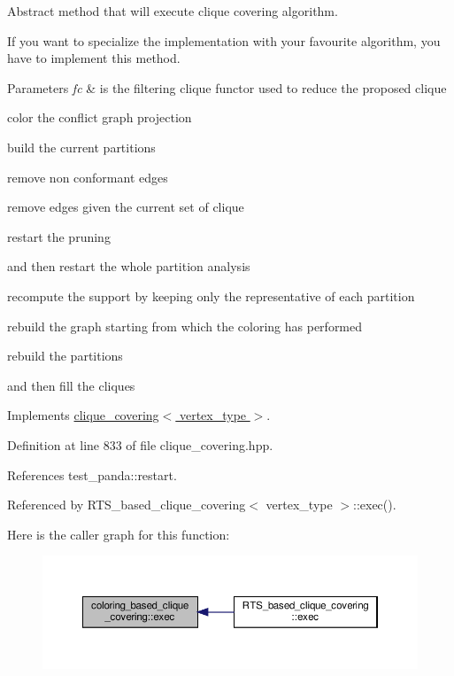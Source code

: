 Abstract method that will execute clique covering algorithm. 

If you want to specialize the implementation with your favourite algorithm, you have to implement this method. 
\begin{DoxyParams}{Parameters}
{\em fc} & is the filtering clique functor used to reduce the proposed clique \\
\hline
\end{DoxyParams}
color the conflict graph projection

build the current partitions

remove non conformant edges

remove edges given the current set of clique

restart the pruning

and then restart the whole partition analysis

recompute the support by keeping only the representative of each partition

rebuild the graph starting from which the coloring has performed

rebuild the partitions

and then fill the cliques 

Implements \hyperlink{classclique__covering_a54c35fc0f400f32f3d412783685150ef}{clique\+\_\+covering$<$ vertex\+\_\+type $>$}.



Definition at line 833 of file clique\+\_\+covering.\+hpp.



References test\+\_\+panda\+::restart.



Referenced by R\+T\+S\+\_\+based\+\_\+clique\+\_\+covering$<$ vertex\+\_\+type $>$\+::exec().

Here is the caller graph for this function\+:
\nopagebreak
\begin{figure}[H]
\begin{center}
\leavevmode
\includegraphics[width=350pt]{dd/d09/classcoloring__based__clique__covering_aeb77d6c0bdc7d04c9b1dcff7baed450b_icgraph}
\end{center}
\end{figure}
\mbox{\label{classcoloring__based__clique__covering_a2323722479808dd83c1df1382355e603}} 
